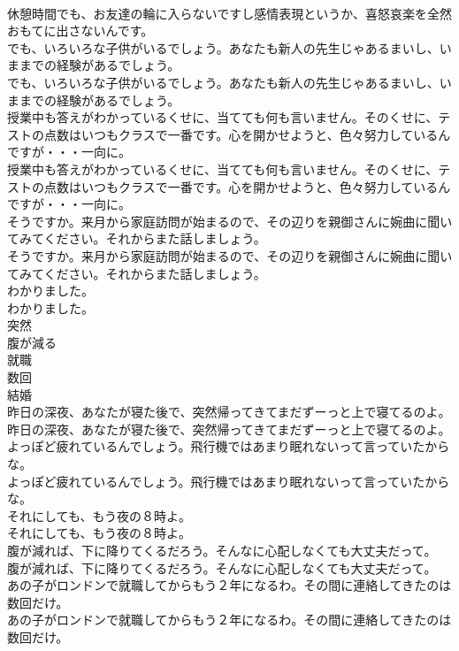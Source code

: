 \documentclass[8pt]{extreport}
\begin{document}
\begin{CJK}{UTF8}{min}
\\	休憩時間でも、お友達の輪に入らないですし感情表現というか、喜怒哀楽を全然おもてに出さないんです。 
\\	でも、いろいろな子供がいるでしょう。あなたも新人の先生じゃあるまいし、いままでの経験があるでしょう。	
\\	でも、いろいろな子供がいるでしょう。あなたも新人の先生じゃあるまいし、いままでの経験があるでしょう。 
\\	授業中も答えがわかっているくせに、当てても何も言いません。そのくせに、テストの点数はいつもクラスで一番です。心を開かせようと、色々努力しているんですが・・・一向に。	
\\	授業中も答えがわかっているくせに、当てても何も言いません。そのくせに、テストの点数はいつもクラスで一番です。心を開かせようと、色々努力しているんですが・・・一向に。 
\\	そうですか。来月から家庭訪問が始まるので、その辺りを親御さんに婉曲に聞いてみてください。それからまた話しましょう。	
\\	そうですか。来月から家庭訪問が始まるので、その辺りを親御さんに婉曲に聞いてみてください。それからまた話しましょう。 
\\	わかりました。	
\\	わかりました。 
\\	突然
\\	腹が減る
\\	就職
\\	数回
\\	結婚
\\	昨日の深夜、あなたが寝た後で、突然帰ってきてまだずーっと上で寝てるのよ。	
\\	昨日の深夜、あなたが寝た後で、突然帰ってきてまだずーっと上で寝てるのよ。 
\\	よっぽど疲れているんでしょう。飛行機ではあまり眠れないって言っていたからな。	
\\	よっぽど疲れているんでしょう。飛行機ではあまり眠れないって言っていたからな。 
\\	それにしても、もう夜の８時よ。	
\\	それにしても、もう夜の８時よ。 
\\	腹が減れば、下に降りてくるだろう。そんなに心配しなくても大丈夫だって。	
\\	腹が減れば、下に降りてくるだろう。そんなに心配しなくても大丈夫だって。 
\\	あの子がロンドンで就職してからもう２年になるわ。その間に連絡してきたのは数回だけ。	
\\	あの子がロンドンで就職してからもう２年になるわ。その間に連絡してきたのは数回だけ。 

\end{CJK}
\end{document}
